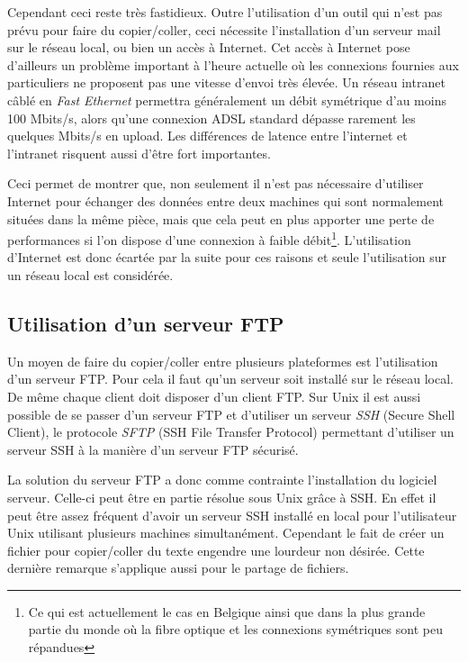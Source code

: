 Cependant ceci reste très fastidieux. Outre l'utilisation d'un outil
qui n'est pas prévu pour faire du copier/coller, ceci nécessite
l'installation d'un serveur mail sur le réseau local, ou bien un accès à
Internet. Cet accès à Internet pose d'ailleurs un problème important
à l'heure actuelle où les connexions fournies aux particuliers ne
proposent pas une vitesse d'envoi très élevée. Un réseau intranet câblé
en \emph{Fast Ethernet} permettra généralement un débit symétrique d'au
moins 100 Mbits/s, alors qu'une connexion ADSL standard dépasse rarement
les quelques Mbits/s en upload. Les différences de latence entre l'internet
et l'intranet risquent aussi d'être fort importantes.

Ceci permet de montrer que, non seulement il n'est pas nécessaire
d'utiliser Internet pour échanger des données entre deux machines
qui sont normalement situées dans la même pièce, mais que cela peut
en plus apporter une perte de performances si l'on dispose d'une
connexion à faible débit\footnote{Ce qui est actuellement le cas en Belgique
ainsi que dans la plus grande partie du monde où la fibre optique et
les connexions symétriques sont peu répandues}.
L'utilisation d'Internet est donc écartée par
la suite pour ces raisons et seule l'utilisation sur un réseau local
est considérée.

\subsection{Utilisation d'un serveur FTP}
Un moyen de faire du copier/coller entre plusieurs plateformes
est l'utilisation d'un serveur FTP. Pour cela il faut qu'un
serveur soit installé sur le réseau local. De même chaque client
doit disposer d'un client FTP. Sur Unix il est aussi possible de se passer
d'un serveur FTP et d'utiliser un serveur \emph{SSH} (Secure Shell Client),
le protocole \emph{SFTP} (SSH File Transfer Protocol) permettant
d'utiliser un serveur SSH à la manière d'un serveur FTP sécurisé.

La solution du serveur FTP a donc comme contrainte l'installation du logiciel
serveur. Celle-ci peut être en partie résolue sous Unix grâce à SSH.
En effet il peut être assez fréquent d'avoir un serveur SSH installé
en local pour l'utilisateur Unix utilisant plusieurs machines simultanément.
Cependant le fait de créer un fichier pour copier/coller du texte engendre
une lourdeur non désirée. Cette dernière remarque s'applique aussi pour
le partage de fichiers.

